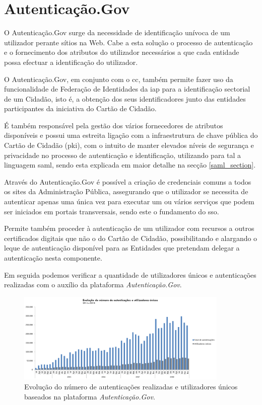 \cleardoublepage
\section{Autenticação.Gov} \label{infoAuthGov}

O Autenticação.Gov surge da necessidade de identificação unívoca de um utilizador perante sítios na Web. Cabe a esta solução o processo de autenticação e o fornecimento dos atributos do utilizador necessários a que cada entidade possa efectuar a identificação do utilizador.

O Autenticação.Gov, em conjunto com o \gls{cc}, também permite fazer uso da funcionalidade de Federação de Identidades da \gls{iap} para a identificação sectorial de um Cidadão, isto é, a obtenção dos seus identificadores junto das entidades participantes da iniciativa do Cartão de Cidadão. 

É também responsável pela gestão dos vários fornecedores de atributos disponíveis e possui uma estreita ligação com a infraestrutura de chave pública do Cartão de Cidadão (\gls{pki}), com o intuito de manter elevados níveis de segurança e privacidade no processo de autenticação e identificação, utilizando para tal a linguagem \gls{saml}, sendo esta explicada em maior detalhe na secção \ref{saml_section}.

Através do Autenticação.Gov é possível a criação de credenciais comuns a todos os sites da Administração Pública, assegurando que o utilizador se necessita de autenticar apenas uma única vez para executar um ou vários serviços que podem ser iniciados em portais transversais, sendo este o fundamento do \gls{sso}.

Permite também proceder à autenticação de um utilizador com recursos a outros certificados digitais que não o do Cartão de Cidadão, possibilitando e alargando o leque de autenticação disponível para as Entidades que pretendam delegar a autenticação nesta componente.

Em seguida podemos verificar a quantidade de utilizadores únicos e autenticações realizadas com o auxílio da plataforma \emph{Autenticação.Gov}.

\begin{figure}[h]
    \centering
    \includegraphics[width=0.9\textwidth]{img/authgov/authgovusage.png}
    \caption{Evolução do número de autenticações realizadas e utilizadores únicos baseados na plataforma \emph{Autenticação.Gov}.\cite{authGovStats}}
\end{figure}

